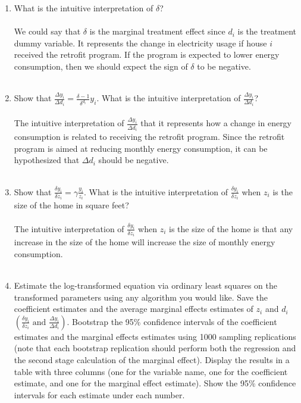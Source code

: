 \documentclass[letterpaper,10pt]{article}
\begin{document}
\begin{enumerate}
\begin{enumerate}
    
    \item  What is the intuitive interpretation of $\delta$?\\
    \\
    We could say that $\delta$ is the marginal treatment effect since $d_i$ is the treatment dummy variable. It represents the change in electricity usage if house $i$ received the retrofit program. If the program is expected to lower energy consumption, then we should expect the sign of $\delta$ to be negative.\\
    \\
    \item Show that $\frac{\Delta y_i}{\Delta d_i}=\frac{\delta-1}{\delta^{d_i}}y_i$. What is the intuitive interpretation of $\frac{\Delta y_i}{\Delta d_i}$?\\
    \\
    The intuitive interpretation of $\frac{\Delta y_i}{\Delta d_i}$ that it represents how a change in energy consumption is related to receiving the retrofit program. Since the retrofit program is aimed at reducing monthly energy consumption, it can be hypothesized that $\Delta d_i$ should be negative.\\
    \\
    \item Show that $\frac{\delta y_i}{\delta z_i}=\gamma\frac{y_i}{z_i}$. What is the intuitive interpretation of $\frac{\delta y_i}{\delta z_i}$ when $z_i$ is the size of the home in square feet?\\
    \\
    The intuitive interpretation of $\frac{\delta y_i}{\delta z_i}$ when $z_i$ is the size of the home is that any increase in the size of the home will increase the size of monthly energy consumption.\\
\\
    \item Estimate the log-transformed equation via ordinary least squares on the transformed parameters using any algorithm you would like. Save the coefficient estimates and the average marginal effects estimates of $z_i$ and $d_i$ $\left(\frac{\delta y_i}{\delta z_i}\text{ and }\frac{\Delta y_i}{\Delta d_i}\right)$. Bootstrap the 95\% confidence intervals of the coefficient estimates and the marginal effects estimates using 1000 sampling replications (note that each bootstrap replication should perform both the regression and the second stage calculation of the marginal effect). Display the results in a table with three columns (one for the variable name, one for the coefficient estimate, and one for the marginal effect estimate). Show the 95\% confidence intervals for each estimate under each number.\\

\end{enumerate}
\end{enumerate}
\end{document}
